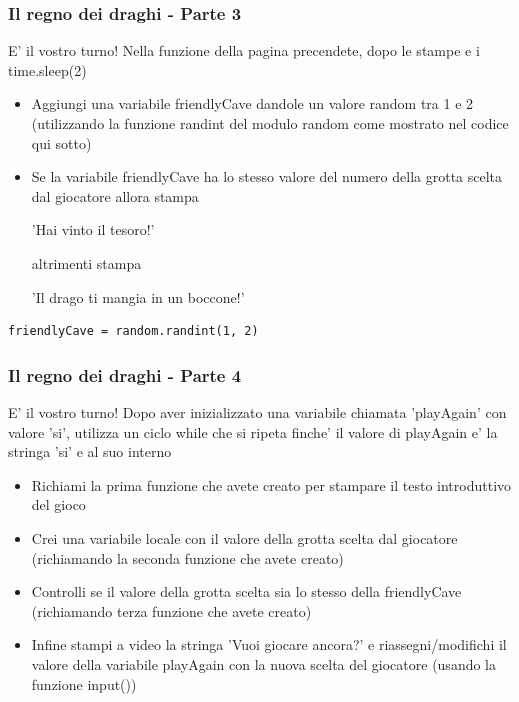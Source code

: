 \documentclass{beamer}
\begin{document}
\begin{frame}[fragile]
\frametitle{Il regno dei draghi - Parte 3}

\begin{block}{E' il vostro turno!}
Nella funzione della pagina precendete, dopo le stampe e i time.sleep(2)
    \begin{itemize}
        \item Aggiungi una variabile friendlyCave dandole un valore random tra 1 e 2 (utilizzando la funzione randint del modulo random come mostrato nel codice qui sotto)
        \item Se la variabile friendlyCave ha lo stesso valore del numero della grotta scelta dal giocatore allora stampa
        
        'Hai vinto il tesoro!'
        
        altrimenti stampa
        
        'Il drago ti mangia in un boccone!'
    \end{itemize}
\end{block}

    \begin{lstlisting}
friendlyCave = random.randint(1, 2)
    \end{lstlisting}
\end{frame}

\begin{frame}[fragile]
\frametitle{Il regno dei draghi - Parte 4}

\begin{block}{E' il vostro turno!}
Dopo aver inizializzato una variabile chiamata 'playAgain' con valore 'si', utilizza un ciclo while che si ripeta finche' il valore di playAgain e' la stringa 'si' e al suo interno
    \begin{itemize}
        \item Richiami la prima funzione che avete creato per stampare il testo introduttivo del gioco
        \item Crei una variabile locale con il valore della grotta scelta dal giocatore (richiamando la seconda funzione che avete creato)
        \item Controlli se il valore della grotta scelta sia lo stesso della friendlyCave (richiamando terza funzione che avete creato)
        \item Infine stampi a video la stringa 'Vuoi giocare ancora?' e riassegni/modifichi il valore della variabile playAgain con la nuova scelta del giocatore (usando la funzione input())
    \end{itemize}
\end{block}
\end{frame}
\end{document}
